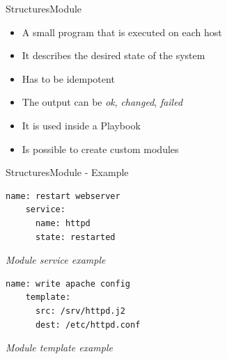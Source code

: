 \documentclass[10pt]{beamer}
\begin{document}
\begin{frame}[fragile]{Structures}{Module}
\begin{itemize}
    \item A small program that is executed on each host
    \item It describes the desired state of the system
    \item Has to be idempotent
    \item The output can be \textit{ok}, \textit{changed}, \textit{failed}
    \item It is used inside a Playbook
    \item Is possible to create custom modules
\end{itemize}
\end{frame}


\begin{frame}[fragile]{Structures}{Module - Example}
\begin{minipage}[t]{0.45\linewidth}


\begin{verbatim}
name: restart webserver
    service:
      name: httpd
      state: restarted
  \end{verbatim}
\footnotesize \textit{Module service example}
\end{minipage}
%
\begin{minipage}[t]{0.45\linewidth}


\begin{verbatim}
name: write apache config
    template:
      src: /srv/httpd.j2
      dest: /etc/httpd.conf
  \end{verbatim}
\footnotesize \textit{Module template example}
\end{minipage}
\end{frame}
\end{document}
